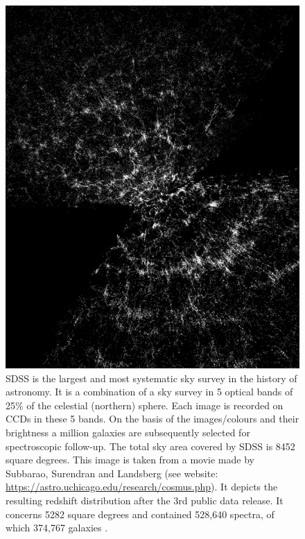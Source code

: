 \documentclass[fleqn,usenatbib]{mnras}
\begin{document}
\begin{figure}
	\centering
	\includegraphics[scale = 0.65]{sdss_redshift}
	\caption{SDSS is the largest and most systematic sky survey in the history of astronomy. It is a combination of a sky survey in 5 optical bands of 25\% of the celestial (northern) sphere. Each image is recorded on CCDs in these 5 bands. On the basis of the images/colours and their brightness a million galaxies are subsequently selected for spectroscopic follow-up. The total sky area covered by SDSS is 8452 square degrees. This image is taken from a movie made by Subbarao, Surendran and Landsberg (see website: \url{https://astro.uchicago.edu/research/cosmus.php}). It depicts the resulting redshift distribution after the 3rd public data release. It concerns 5282 square degrees and contained 528,640 spectra, of which 374,767 galaxies \citep{van_de_weygaert_cosmic_2011}.}
	\label{fig:sdss_rdshft}
\end{figure}
\end{document}
